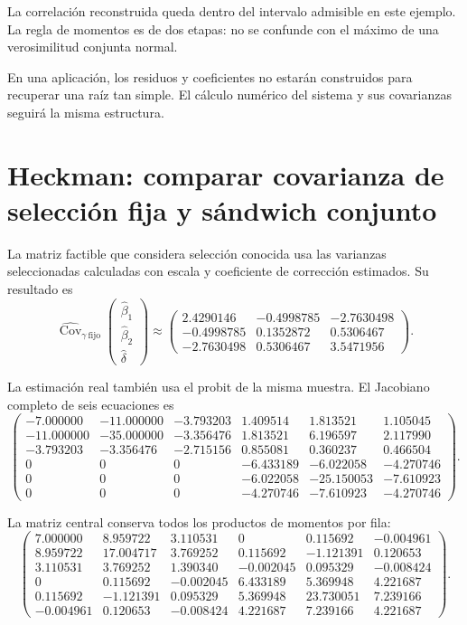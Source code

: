 \documentclass[11pt,a4paper]{article}
\DeclareMathOperator{\Cov}{Cov}
\begin{document}
La correlación reconstruida queda
dentro del intervalo admisible
en este ejemplo.
La regla de momentos
es de dos etapas:
no se confunde con
el máximo de una
verosimilitud conjunta normal.

En una aplicación, los
residuos y coeficientes
no estarán construidos
para recuperar una raíz
tan simple. El cálculo
numérico del sistema
y sus covarianzas
seguirá la misma estructura.

\clearpage
\section{Heckman: comparar covarianza de selección fija y sándwich conjunto}\label{unidad163}
La matriz factible que
considera selección conocida
usa las varianzas seleccionadas
calculadas con escala y
coeficiente de corrección estimados.
Su resultado es
\[
\widehat{\Cov}_{\gamma\ \text{fijo}}
\begin{pmatrix}\widehat\beta_1\\\widehat\beta_2\\\widehat\delta\end{pmatrix}
\approx\begin{pmatrix}2.4290146&-0.4998785&-2.7630498\\-0.4998785&0.1352872&0.5306467\\-2.7630498&0.5306467&3.5471956\end{pmatrix}.
\]

La estimación real también
usa el probit de la
misma muestra.
El Jacobiano completo de
seis ecuaciones es
\[
\begin{pmatrix}-7.000000&-11.000000&-3.793203&1.409514&1.813521&1.105045\\-11.000000&-35.000000&-3.356476&1.813521&6.196597&2.117990\\-3.793203&-3.356476&-2.715156&0.855081&0.360237&0.466504\\0&0&0&-6.433189&-6.022058&-4.270746\\0&0&0&-6.022058&-25.150053&-7.610923\\0&0&0&-4.270746&-7.610923&-4.270746\end{pmatrix}.
\]

La matriz central conserva
todos los productos de
momentos por fila:
\[
\begin{pmatrix}7.000000&8.959722&3.110531&0&0.115692&-0.004961\\8.959722&17.004717&3.769252&0.115692&-1.121391&0.120653\\3.110531&3.769252&1.390340&-0.002045&0.095329&-0.008424\\0&0.115692&-0.002045&6.433189&5.369948&4.221687\\0.115692&-1.121391&0.095329&5.369948&23.730051&7.239166\\-0.004961&0.120653&-0.008424&4.221687&7.239166&4.221687\end{pmatrix}.
\]
\end{document}
